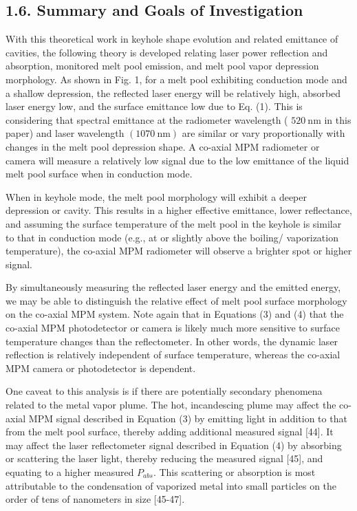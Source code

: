 \documentclass[10pt]{article}
\begin{document}
\subsection*{1.6. Summary and Goals of Investigation}
With this theoretical work in keyhole shape evolution and related emittance of cavities, the following theory is developed relating laser power reflection and absorption, monitored melt pool emission, and melt pool vapor depression morphology. As shown in Fig. 1, for a melt pool exhibiting conduction mode and a shallow depression, the reflected laser energy will be relatively high, absorbed laser energy low, and the surface emittance low due to Eq. (1). This is considering that spectral emittance at the radiometer wavelength ( $520 \mathrm{~nm}$ in this paper) and laser wavelength $(1070 \mathrm{~nm})$ are similar or vary proportionally with changes in the melt pool depression shape. A co-axial MPM radiometer or camera will measure a relatively low signal due to the low emittance of the liquid melt pool surface when in conduction mode.

When in keyhole mode, the melt pool morphology will exhibit a deeper depression or cavity. This results in a higher effective emittance, lower reflectance, and assuming the surface temperature of the melt pool in the keyhole is similar to that in conduction mode (e.g., at or slightly above the boiling/ vaporization temperature), the co-axial MPM radiometer will observe a brighter spot or higher signal.

By simultaneously measuring the reflected laser energy and the emitted energy, we may be able to distinguish the relative effect of melt pool surface morphology on the co-axial MPM system. Note again that in Equations (3) and (4) that the co-axial MPM photodetector or camera is likely much more sensitive to surface temperature changes than the reflectometer. In other words, the dynamic laser reflection is relatively independent of surface temperature, whereas the co-axial MPM camera or photodetector is dependent.

One caveat to this analysis is if there are potentially secondary phenomena related to the metal vapor plume. The hot, incandescing plume may affect the co-axial MPM signal described in Equation (3) by emitting light in addition to that from the melt pool surface, thereby adding additional measured signal [44]. It may affect the laser reflectometer signal described in Equation (4) by absorbing or scattering the laser light, thereby reducing the measured signal [45], and equating to a higher measured $P_{a b s}$. This scattering or absorption is most attributable to the condensation of vaporized metal into small particles on the order of tens of nanometers in size [45-47].
\end{document}
